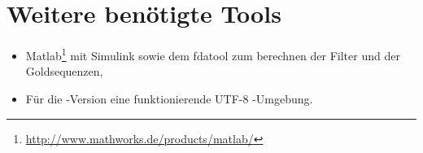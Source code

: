 
\section{Weitere benötigte Tools}
\begin{itemize}
		\item Matlab\footnote{\url{http://www.mathworks.de/products/matlab/}} mit Simulink sowie dem fdatool zum berechnen der Filter und der Goldsequenzen,
		\item Für die \latex-Version eine funktionierende UTF-8 \latex-Umgebung.
\end{itemize}


